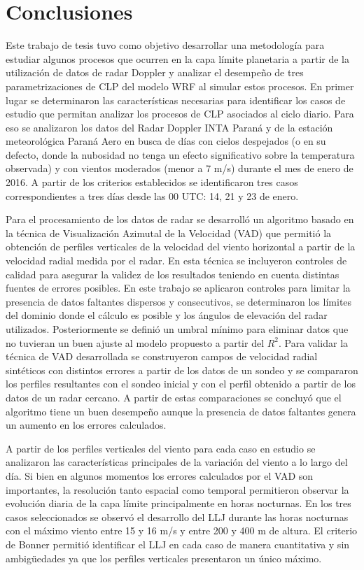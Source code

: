 \documentclass[12pt,spanish,oneside, a4paper]{book}
\begin{document}
\chapter{Conclusiones}\label{conclusiones}

Este trabajo de tesis tuvo como objetivo desarrollar una metodología
para estudiar algunos procesos que ocurren en la capa límite planetaria
a partir de la utilización de datos de radar Doppler y analizar el
desempeño de tres parametrizaciones de CLP del modelo WRF al simular
estos procesos. En primer lugar se determinaron las características
necesarias para identificar los casos de estudio que permitan analizar
los procesos de CLP asociados al ciclo diario. Para eso se analizaron
los datos del Radar Doppler INTA Paraná y de la estación meteorológica
Paraná Aero en busca de días con cielos despejados (o en su defecto,
donde la nubosidad no tenga un efecto significativo sobre la temperatura
observada) y con vientos moderados (menor a 7 m/s) durante el mes de
enero de 2016. A partir de los criterios establecidos se identificaron
tres casos correspondientes a tres días desde las 00 UTC: 14, 21 y 23 de
enero.

Para el procesamiento de los datos de radar se desarrolló un algoritmo
basado en la técnica de Visualización Azimutal de la Velocidad (VAD) que
permitió la obtención de perfiles verticales de la velocidad del viento
horizontal a partir de la velocidad radial medida por el radar. En esta
técnica se incluyeron controles de calidad para asegurar la validez de
los resultados teniendo en cuenta distintas fuentes de errores posibles.
En este trabajo se aplicaron controles para limitar la presencia de
datos faltantes dispersos y consecutivos, se determinaron los límites
del dominio donde el cálculo es posible y los ángulos de elevación del
radar utilizados. Posteriormente se definió un umbral mínimo para
eliminar datos que no tuvieran un buen ajuste al modelo propuesto a
partir del \(R^2\). Para validar la técnica de VAD desarrollada se
construyeron campos de velocidad radial sintéticos con distintos errores
a partir de los datos de un sondeo y se compararon los perfiles
resultantes con el sondeo inicial y con el perfil obtenido a partir de
los datos de un radar cercano. A partir de estas comparaciones se
concluyó que el algoritmo tiene un buen desempeño aunque la presencia de
datos faltantes genera un aumento en los errores calculados.

A partir de los perfiles verticales del viento para cada caso en estudio
se analizaron las características principales de la variación del viento
a lo largo del día. Si bien en algunos momentos los errores calculados
por el VAD son importantes, la resolución tanto espacial como temporal
permitieron observar la evolución diaria de la capa límite
principalmente en horas nocturnas. En los tres casos seleccionados se
observó el desarrollo del LLJ durante las horas nocturnas con el máximo
viento entre 15 y 16 m/s y entre 200 y 400 m de altura. El criterio de
Bonner permitió identificar el LLJ en cada caso de manera cuantitativa y
sin ambigüedades ya que los perfiles verticales presentaron un único
máximo.
\end{document}
